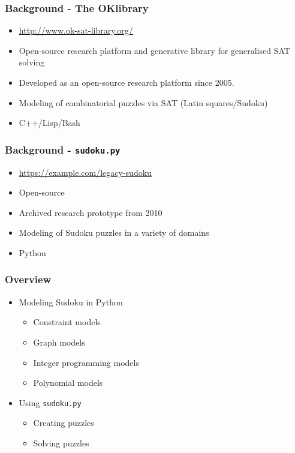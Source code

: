 \documentclass{beamer}
\title{\talktitle}
\author{\Us}
\date{\talkdate}
\begin{document}
\begin{frame}
  \titlepage
  \conferencebanner
\end{frame}

\begin{frame}
\frametitle{Background - The OKlibrary}
 \begin{itemize}
  \item<1-> \url{http://www.ok-sat-library.org/}
  \item<2-> Open-source research platform and generative library for generalised SAT solving
  \item<3-> Developed as an open-source research platform since 2005.
  \item<4-> Modeling of combinatorial puzzles via SAT (Latin squares/Sudoku)
  \item<5-> C++/Lisp/Bash
 \end{itemize}
\end{frame}

\begin{frame}
\frametitle{Background - \texttt{sudoku.py}}
 \begin{itemize}
  \item<1-> \url{https://example.com/legacy-sudoku}
  \item<2-> Open-source 
  \item<3-> Archived research prototype from 2010
  \item<4-> Modeling of Sudoku puzzles in a variety of domains
  \item<5-> Python
 \end{itemize}
\end{frame}

\begin{frame}
\frametitle{Overview}
 \begin{itemize}
  \item<1-> {Modeling Sudoku in Python
    \begin{itemize}
      \item<2-> Constraint models
      \item<3-> Graph models
      \item<4-> Integer programming models
      \item<5-> Polynomial models
    \end{itemize}}
  \item<6-> {Using \texttt{sudoku.py} 
    \begin{itemize}
      \item<7-> Creating puzzles
      \item<8-> Solving puzzles
    \end{itemize}}
 \end{itemize}
\end{frame}
\end{document}
